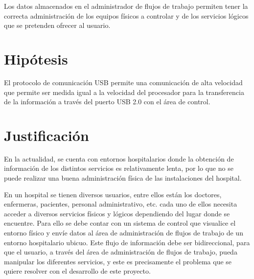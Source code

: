\vspace{0.1cm}

Los datos almacenados en el administrador de flujos de trabajo
permiten tener la correcta administración de los equipos físicos a
controlar y de los servicios lógicos que se pretenden ofrecer al
usuario.\\

\vspace{0.2cm}

\section{Hipótesis}

El protocolo de comunicación USB permite una comunicación de alta
velocidad que permite ser medida igual a la velocidad del
procesador para la transferencia de la información a través del
puerto USB 2.0 con el área de control.\\

\vspace{0.2cm}

\newpage
\section{Justificación}

En la actualidad, se cuenta con entornos hospitalarios donde la
obtención de información de los distintos servicios es
relativamente lenta, por lo que no se puede realizar una buena
administración física de las instalaciones del hospital.\\

\vspace{0.2cm}

En un hospital se tienen diversos usuarios, entre ellos están los
doctores, enfermeras, pacientes, personal administrativo, etc.
cada uno de ellos necesita acceder a diversos servicios físicos y
lógicos dependiendo del lugar donde se encuentre. Para ello se
debe contar con un sistema de control que visualice el entorno
físico y envíe datos al área de administración de flujos de
trabajo de un entorno hospitalario ubicuo. Este flujo de
información debe ser bidireccional, para que el usuario, a través
del área de administración de flujos de trabajo, pueda manipular
los diferentes servicios, y este es precisamente el problema que
se quiere resolver con el desarrollo de este proyecto.\\

\vspace{0.2cm}

